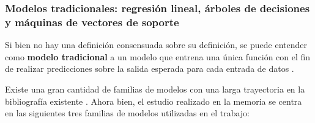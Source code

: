 \subsubsection{Modelos tradicionales: regresión lineal, árboles de decisiones y máquinas de vectores de soporte}

Si bien no hay una definición consensuada sobre su definición, se puede entender como \textbf{modelo tradicional} a un modelo que entrena una única función con el fin de realizar predicciones sobre la salida esperada para cada entrada de datos \cite{aima}.

Existe una gran cantidad de familias de modelos con una larga trayectoria en la bibliografía existente \cite{Burkov2019TheHM}. Ahora bien, el estudio realizado en la memoria se centra en las siguientes tres familias de modelos utilizadas en el trabajo:

